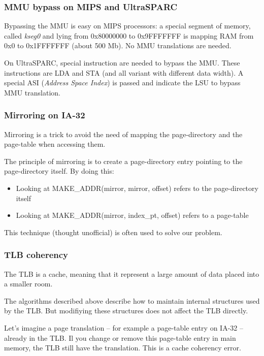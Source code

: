 
\begin{frame}
  \frametitle{MMU bypass on MIPS and UltraSPARC}

  Bypassing the MMU is easy on MIPS processors: a special segment of
  memory, called \emph{kseg0} and lying from 0x80000000 to 0x9FFFFFFF
  is mapping RAM from 0x0 to 0x1FFFFFFF (about 500 Mb). No MMU
  translations are needed.

  \-

  On UltraSPARC, special instruction are needed to bypass the
  MMU. These instructions are LDA and STA (and all variant with
  different data width). A special ASI (\emph{Address Space Index}) is
  passed and indicate the LSU to bypass MMU translation.

\end{frame}


\begin{frame}
  \frametitle{Mirroring on IA-32}

  Mirroring is a trick to avoid the need of mapping the page-directory
  and the page-table when accessing them.

  \-

  The principle of mirroring is to create a page-directory entry
  pointing to the page-directory itself. By doing this:

  \begin{itemize}
  \item
    Looking at MAKE\_ADDR(mirror, mirror, offset) refers to the
    page-directory itself
  \item
    Looking at MAKE\_ADDR(mirror, index\_pt, offset) refers to a
    page-table
  \end{itemize}

  \-

  This technique (thought unofficial) is often used to solve our problem.

\end{frame}


\begin{frame}
  \frametitle{TLB coherency}

  The TLB is a cache, meaning that it represent a large amount of data
  placed into a smaller room.

  \-

  The algorithms described above describe how to maintain internal
  structures used by the TLB. But modifiying these structures does not
  affect the TLB directly.

  \-

  Let's imagine a page translation -- for example a page-table entry
  on IA-32 -- already in the TLB. Il you change or remove this
  page-table entry in main memory, the TLB still have the
  translation. This is a cache coherency error.

\end{frame}


